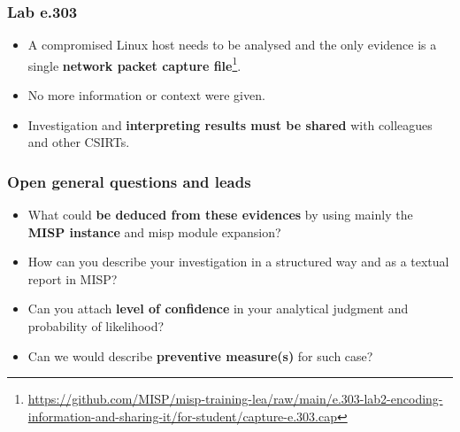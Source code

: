
\begin{frame}[t,plain]
\titlepage
\end{frame}

\begin{frame}
    \frametitle{Lab e.303}
    \begin{itemize}
        \item A compromised Linux host needs to be analysed and the only evidence is a single {\bf network packet capture file}\footnote{\url{https://github.com/MISP/misp-training-lea/raw/main/e.303-lab2-encoding-information-and-sharing-it/for-student/capture-e.303.cap}}.
        \item No more information or context were given.
        \item Investigation and {\bf interpreting results must be shared} with colleagues and other CSIRTs.
    \end{itemize}

\end{frame}

\begin{frame}
   \frametitle{Open general questions and leads}
    \begin{itemize}
        \item What could {\bf be deduced from these evidences} by using mainly the {\bf MISP instance} and misp module expansion?
        \item How can you describe your investigation in a structured way and as a textual report in MISP?
        \item Can you attach {\bf level of confidence} in your analytical judgment and probability of likelihood?
        \item Can we would describe {\bf preventive measure(s)} for such case?
    \end{itemize}
\end{frame}

